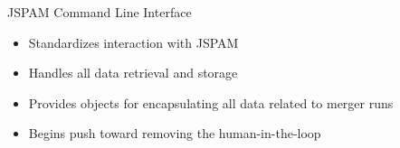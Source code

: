 \documentclass{beamer}
\begin{document}

\begin{frame}{JSPAM Command Line Interface}
    \begin{itemize}
        \item Standardizes interaction with JSPAM
        \item Handles all data retrieval and storage
        \item Provides objects for encapsulating all data related to merger runs
        \item Begins push toward removing the human-in-the-loop
    \end{itemize}
\end{frame}
\end{document}
